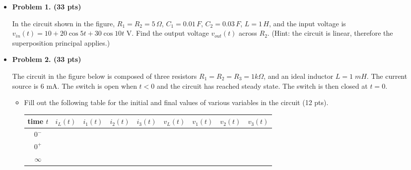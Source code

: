 \begin{itemize}
\item {\bf Problem 1. (33 pts)}

In the circuit shown in the figure, $R_1=R_2=5\,\Omega$, $C_1=0.01\,F$,
$C_2=0.03\,F$, $L=1\,H$, and the input voltage is 
$v_{in}(t)=10+20\cos 5 t+30 \cos 10 t$ V. Find the output voltage $v_{out}(t)$
across $R_2$. (Hint: the circuit is linear, therefore the superposition
principal applies.)



\item {\bf Problem 2. (33 pts)}

The circuit in the figure below is composed of three resistors
$R_1=R_2=R_3=1k\Omega$, and an ideal inductor $L=1\;mH$. The current source 
is 6 mA. The switch is open when $t<0$ and the circuit has reached steady
state. The switch is then closed at $t=0$. 


\begin{itemize}

\item Fill out the following table for the initial and final values of various
variables in the circuit (12 pts).

\begin{tabular}{c||cccc|cccc} \hline
  time $t$&$i_L(t)$&$i_1(t)$&$i_2(t)$&$i_3(t)$&$v_L(t)$&$v_1(t)$&$v_2(t)$&$v_3(t)$\\ \hline \hline
  $0^-$    & & & & & & & & \\ \hline
  $0^+$    & & & & & & & & \\ \hline
  $\infty$ & & & & & & & & \\ \hline
\end{tabular}


\end{itemize}
\end{itemize}
